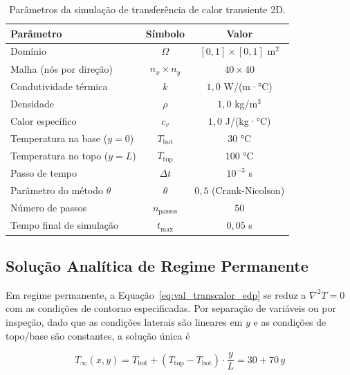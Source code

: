 \begin{table}[htbp]
    \centering
    \caption{Parâmetros da simulação de transferência de calor transiente 2D.}
    \label{tab:val_transcalor_params}
    \begin{tabular}{lcc}
        \hline
        \textbf{Parâmetro} & \textbf{Símbolo} & \textbf{Valor} \\
        \hline
        Domínio                         & $\Omega$     & $[0, 1] \times [0, 1]$ m$^{2}$ \\
        Malha (nós por direção)         & $n_x \times n_y$ & $40 \times 40$             \\
        Condutividade térmica           & $k$          & $1{,}0$ W/(m·°C)               \\
        Densidade                       & $\rho$       & $1{,}0$ kg/m$^3$               \\
        Calor específico                & $c_v$        & $1{,}0$ J/(kg·°C)              \\
        Temperatura na base ($y = 0$)   & $T_{\mathrm{bot}}$ & $30$ °C                  \\
        Temperatura no topo ($y = L$)   & $T_{\mathrm{top}}$ & $100$ °C                 \\
        Passo de tempo                  & $\Delta t$   & $10^{-3}$ s                    \\
        Parâmetro do método $\theta$    & $\theta$     & $0{,}5$ (Crank-Nicolson)       \\
        Número de passos                & $n_{\mathrm{passos}}$ & $50$                  \\
        Tempo final de simulação        & $t_{\max}$   & $0{,}05$ s                     \\
        \hline
    \end{tabular}
\end{table}

\subsection{Solução Analítica de Regime Permanente}

Em regime permanente, a Equação~\eqref{eq:val_transcalor_edp} se reduz a $\nabla^2 T = 0$ com as condições de contorno especificadas. Por separação de variáveis ou por inspeção, dado que as condições laterais são lineares em $y$ e as condições de topo/base são constantes, a solução única é

\begin{equation}
    T_{\infty}(x, y) = T_{\mathrm{bot}} + (T_{\mathrm{top}} - T_{\mathrm{bot}}) \cdot \frac{y}{L} = 30 + 70 \, y
    \label{eq:val_transcalor_analitica}
\end{equation}

